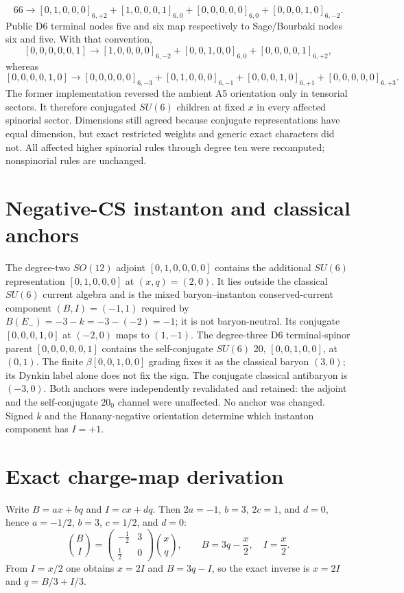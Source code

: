 \documentclass{article}
\begin{document}
\[66\to[0,1,0,0,0]_{6,+2}+[1,0,0,0,1]_{6,0}+[0,0,0,0,0]_{6,0}+[0,0,0,1,0]_{6,-2}.\]
Public D6 terminal nodes five and six map respectively to Sage/Bourbaki nodes six and five. With that convention,
\[[0,0,0,0,0,1]\to[1,0,0,0,0]_{6,-2}+[0,0,1,0,0]_{6,0}+[0,0,0,0,1]_{6,+2},\]
whereas
\[[0,0,0,0,1,0]\to[0,0,0,0,0]_{6,-3}+[0,1,0,0,0]_{6,-1}+[0,0,0,1,0]_{6,+1}+[0,0,0,0,0]_{6,+3}.\]
The former implementation reversed the ambient A5 orientation only in tensorial sectors. It therefore conjugated $SU(6)$ children at fixed $x$ in every affected spinorial sector. Dimensions still agreed because conjugate representations have equal dimension, but exact restricted weights and generic exact characters did not. All affected higher spinorial rules through degree ten were recomputed; nonspinorial rules are unchanged.
\section{Negative-CS instanton and classical anchors} The degree-two $SO(12)$ adjoint $[0,1,0,0,0,0]$ contains the additional $SU(6)$ representation $[0,1,0,0,0]$ at $(x,q)=(2,0)$. It lies outside the classical $SU(6)$ current algebra and is the mixed baryon--instanton conserved-current component $(B,I)=(-1,1)$ required by $B(E_-)=-3-k=-3-(-2)=-1$; it is not baryon-neutral. Its conjugate $[0,0,0,1,0]$ at $(-2,0)$ maps to $(1,-1)$. The degree-three D6 terminal-spinor parent $[0,0,0,0,0,1]$ contains the self-conjugate $SU(6)$ 20, $[0,0,1,0,0]$, at $(0,1)$. The finite $\beta[0,0,1,0,0]$ grading fixes it as the classical baryon $(3,0)$; its Dynkin label alone does not fix the sign. The conjugate classical antibaryon is $(-3,0)$. Both anchors were independently revalidated and retained: the adjoint and the self-conjugate $20_0$ channel were unaffected. No anchor was changed. Signed $k$ and the Hanany-negative orientation determine which instanton component has $I=+1$.
\section{Exact charge-map derivation} Write $B=ax+bq$ and $I=cx+dq$. Then $2a=-1$, $b=3$, $2c=1$, and $d=0$, hence $a=-1/2$, $b=3$, $c=1/2$, and $d=0$:
\[\binom BI=\begin{pmatrix}-\frac12&3\\\frac12&0\end{pmatrix}\binom xq,\qquad B=3q-\frac{x}{2},\quad I=\frac{x}{2}.\]
From $I=x/2$ one obtains $x=2I$ and $B=3q-I$, so the exact inverse is $x=2I$ and $q=B/3+I/3$.
\end{document}
